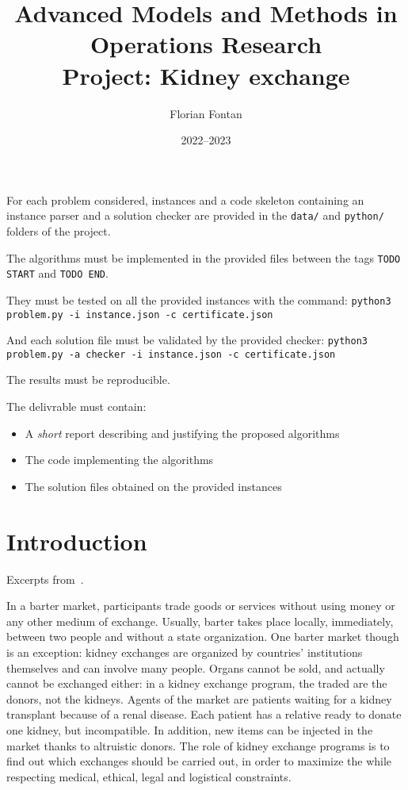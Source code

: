 \documentclass[a4paper,twocolumn]{article}
\author{Florian Fontan}
\title{Advanced Models and Methods in Operations Research \\ Project: Kidney exchange}
\date{2022--2023}
\begin{document}
\maketitle

For each problem considered, instances and a code skeleton containing an instance parser and a solution checker are provided in the \texttt{data/} and \texttt{python/} folders of the project.

The algorithms must be implemented in the provided files between the tags \texttt{TODO START} and \texttt{TODO END}.

They must be tested on all the provided instances with the command:
\texttt{python3 problem.py -i instance.json -c certificate.json}

And each solution file must be validated by the provided checker:
\texttt{python3 problem.py -a checker -i instance.json -c certificate.json}

The results must be reproducible.

\bigskip

The delivrable must contain:
\begin{itemize}
  \item A \emph{short} report describing and justifying the proposed algorithms
  \item The code implementing the algorithms
  \item The solution files obtained on the provided instances
\end{itemize}

\section*{Introduction}

Excerpts from~\cite{pansart_algorithms_2020}.

In a barter market, participants trade goods or services without using money or any other medium of exchange. Usually, barter takes place locally, immediately, between two people and without a state organization. One barter market though is an exception: kidney exchanges are organized by countries’ institutions themselves and can involve many people. Organs
cannot be sold, and actually cannot be exchanged either: in a kidney exchange program, the traded  are the donors, not the kidneys. Agents of the market are patients waiting for a kidney transplant because of a renal disease. Each patient has a relative ready to donate one kidney, but incompatible. In addition, new items can be injected in the market thanks
to altruistic donors. The role of kidney exchange programs is to find out which exchanges should be carried out, in order to maximize the  while respecting medical, ethical, legal and logistical constraints.
\end{document}

